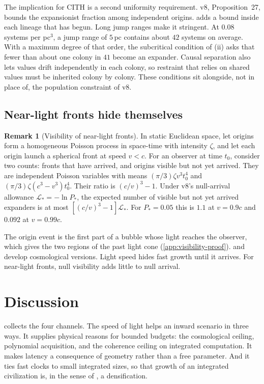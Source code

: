 \documentclass[11pt,a4paper]{article}
\theoremstyle{definition}
\newtheorem{remark}[proposition]{Remark}
\newcommand{\CITH}{\textsc{CITH}}
\begin{document}
The implication for \CITH{} is a second uniformity requirement. v8,
Proposition~27, bounds the expansionist fraction among independent origins.
 adds a bound inside each lineage that has begun. Long jump
ranges make it stringent. At $0.08$ systems per pc$^3$, a jump range of $5\,$pc
contains about $42$ systems on average. With a maximum degree of that order,
the subcritical condition of (ii) asks that fewer than about one colony in $41$
become an expander. Causal separation
also lets values drift independently in each colony, so restraint that relies
on shared values must be inherited colony by colony. These conditions sit
alongside, not in place of, the population constraint of v8.

\subsection{Near-light fronts hide themselves}
\begin{remark}[Visibility of near-light fronts]
\label{rem:visibility}
In static Euclidean space, let origins form a homogeneous Poisson process in
space-time with intensity $\zeta$, and let each origin launch a spherical front
at speed $v<c$. For an observer at time $t_0$, consider two counts: fronts that
have arrived, and origins visible but not yet arrived. They are independent
Poisson variables with means $(\pi/3)\zeta v^3t_0^4$ and
$(\pi/3)\zeta(c^3-v^3)t_0^4$. Their ratio is $(c/v)^3-1$. Under v8's null-arrival
allowance $\mathcal L_*=-\ln P_*$, the expected number of visible but not yet
arrived expanders is at most $[(c/v)^3-1]\mathcal L_*$. For $P_*=0.05$ this is
$1.1$ at $v=0.9c$ and $0.092$ at $v=0.99c$.
\end{remark}
\noindent The origin event is the first part of a bubble whose light reaches
the observer, which gives the two regions of the past light cone
(\cref{app:visibility-proof}).  and \citet{Hanson2021Grabby}
develop cosmological versions. Light speed hides fast growth until it arrives.
For near-light fronts, null visibility adds little to null arrival.

\section{Discussion}
\label{sec:discussion}
 collects the four channels. The speed of light helps an
inward scenario in three ways. It supplies physical reasons for bounded
budgets: the cosmological ceiling, polynomial acquisition, and the coherence
ceiling on integrated computation. It makes latency a consequence of
geometry rather than a free parameter. And it ties fast
clocks to small integrated sizes, so that growth of an integrated
civilization is, in the sense of \citet{Smart2012}, a densification.
\end{document}
